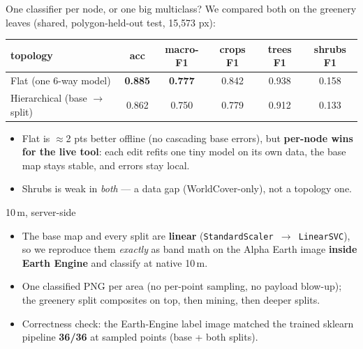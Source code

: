 \documentclass[aspectratio=169]{beamer}
\begin{document}
\begin{frame}{One classifier per node, or one big multiclass?}
We compared both on the greenery leaves (shared, polygon-held-out test, 15{,}573 px):
\vspace{0.4em}
\centering
\small
\begin{tabular}{l c c c c c}
\toprule
\textbf{topology} & \textbf{acc} & \textbf{macro-F1} & crops F1 & trees F1 & shrubs F1 \\
\midrule
Flat (one 6-way model)        & \textbf{0.885} & \textbf{0.777} & 0.842 & 0.938 & 0.158 \\
Hierarchical (base $\to$ split) & 0.862 & 0.750 & 0.779 & 0.912 & 0.133 \\
\bottomrule
\end{tabular}
\vspace{0.8em}
\flushleft
\begin{itemize}\small
  \item Flat is $\approx$2 pts better offline (no cascading base errors), but
  \textbf{per-node wins for the live tool}: each edit refits one tiny model on its own
  data, the base map stays stable, and errors stay local.
  \item Shrubs is weak in \emph{both} --- a data gap (WorldCover-only), not a topology
  one.
\end{itemize}
\end{frame}

\begin{frame}{10\,m, server-side}
\begin{itemize}
  \item The base map and every split are \textbf{linear} (\texttt{StandardScaler $\to$
  LinearSVC}), so we reproduce them \emph{exactly} as band math on the Alpha Earth image
  \textbf{inside Earth Engine} and classify at native 10\,m.
  \item One classified PNG per area (no per-point sampling, no payload blow-up); the
  greenery split composites on top, then mining, then deeper splits.
  \item Correctness check: the Earth-Engine label image matched the trained sklearn
  pipeline \textbf{36/36} at sampled points (base + both splits).
\end{itemize}
\end{frame}
\end{document}
